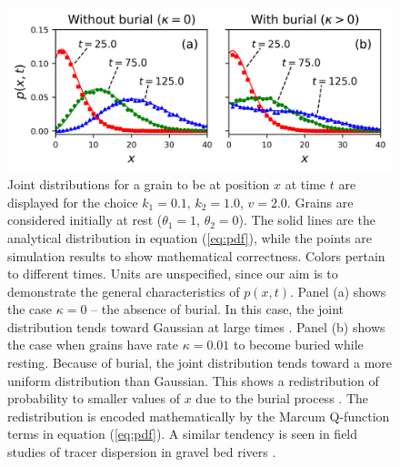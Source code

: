 \documentclass[]{agujournal2018}
\begin{document}
\begin{figure}
	\includegraphics[width=\linewidth,keepaspectratio]{./figures/pdf-plot.png}
	\caption{Joint distributions for a grain to be at position $x$ at time $t$ are displayed for the choice $k_1=0.1$, $k_2=1.0$, $v=2.0$. Grains are considered initially at rest ($\theta_1=1$, $\theta_2=0$). The solid lines are the analytical distribution in equation (\ref{eq:pdf}), while the points are simulation results to show mathematical correctness. Colors pertain to different times. Units are unspecified, since our aim is to demonstrate the general characteristics of $p(x,t)$. Panel (a) shows the case $\kappa=0$ -- the absence of burial.
	In this case, the joint distribution tends toward Gaussian at large times \citep[e.g.][]{Einstein1937,Lisle1998}. Panel (b) shows the case when grains have rate $\kappa = 0.01$ to become buried while resting.
	Because of burial, the joint distribution tends toward a more uniform distribution than Gaussian. This shows a redistribution of probability to smaller values of $x$ due to the burial process \citep[c.f.][]{Wu2019}. The redistribution is encoded mathematically by the Marcum Q-function terms in equation  (\ref{eq:pdf}). A similar tendency is seen in field studies of tracer dispersion in gravel bed rivers \citep[e.g.][]{Hassan1994}.}
	\label{fig:pdfs}
\end{figure}
\end{document}
